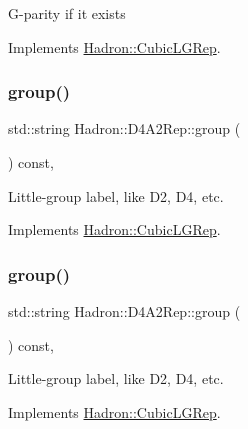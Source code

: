 G-\/parity if it exists 

Implements \mbox{\hyperlink{structHadron_1_1CubicLGRep_ace26f7b2d55e3a668a14cb9026da5231}{Hadron\+::\+Cubic\+L\+G\+Rep}}.

\mbox{\label{structHadron_1_1D4A2Rep_a4f1794198aaae635c3f2fa3816c36942}} 
\subsubsection{\texorpdfstring{group()}{group()}\hspace{0.1cm}{\footnotesize\ttfamily [1/5]}}
{\footnotesize\ttfamily std\+::string Hadron\+::\+D4\+A2\+Rep\+::group (\begin{DoxyParamCaption}{ }\end{DoxyParamCaption}) const\hspace{0.3cm}{\ttfamily [inline]}, {\ttfamily [virtual]}}

Little-\/group label, like D2, D4, etc. 

Implements \mbox{\hyperlink{structHadron_1_1CubicLGRep_a9bdb14b519a611d21379ed96a3a9eb41}{Hadron\+::\+Cubic\+L\+G\+Rep}}.

\mbox{\label{structHadron_1_1D4A2Rep_a4f1794198aaae635c3f2fa3816c36942}} 
\subsubsection{\texorpdfstring{group()}{group()}\hspace{0.1cm}{\footnotesize\ttfamily [2/5]}}
{\footnotesize\ttfamily std\+::string Hadron\+::\+D4\+A2\+Rep\+::group (\begin{DoxyParamCaption}{ }\end{DoxyParamCaption}) const\hspace{0.3cm}{\ttfamily [inline]}, {\ttfamily [virtual]}}

Little-\/group label, like D2, D4, etc. 

Implements \mbox{\hyperlink{structHadron_1_1CubicLGRep_a9bdb14b519a611d21379ed96a3a9eb41}{Hadron\+::\+Cubic\+L\+G\+Rep}}.

\mbox{\label{structHadron_1_1D4A2Rep_a4f1794198aaae635c3f2fa3816c36942}} 
